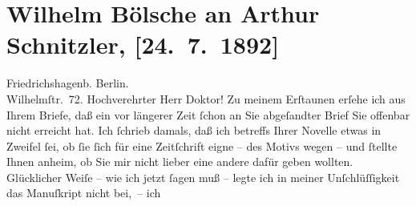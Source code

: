 

         
         \renewcommand{\erwaehntePersonen}{Personen: Wilhelm Bölsche}
         \renewcommand{\erwaehnteOrte}{Orte: Berlin, Friedrichshagen, Peter-Hille-Straße, Wien}
         \renewcommand{\erwaehnteWerke}{Werke: Das Himmelbett}
               \section[Wilhelm Bölsche an Arthur Schnitzler, {[}24. 7. 1892{]}]{ Wilhelm Bölsche an Arthur Schnitzler, {[}24. 7. 1892{]}}\nopagebreak{}\rehead{ }\begin{ledgroupsized}[t]{13cm}\normalsize\beginnumbering \toendnotes[C]{\smallbreak\pagebreak[2]} 
\toendnotes[C]{\smallbreak}\pstart
           \raggedleft{}{\pb}Friedrichshagenb. Berlin.{\\}Wilhelmſtr. 72.\pend
           \pstart\center{}Hochverehrter Herr Doktor!\pend\pstart
           Zu meinem Erſtaunen erſehe ich aus Ihrem Briefe, daß ein vor längerer Zeit ſchon an
               Sie abgeſandter Brief Sie offenbar nicht erreicht hat. Ich ſchrieb damals, daß ich
               betreffs Ihrer Novelle etwas
                  \introOben{}in\introOben{} Zweifel ſei, ob ſie ſich für eine Zeitſchrift eigne –
               des Motivs wegen – und ſtellte Ihnen anheim, ob Sie mir nicht lieber eine andere
               dafür geben wollten. Glücklicher Weiſe – wie ich jetzt ſagen muß – legte ich in {\pb}meiner Unſchlüſſigkeit das Manuſkript nicht bei, – ich

\end{ledgroupsized}
